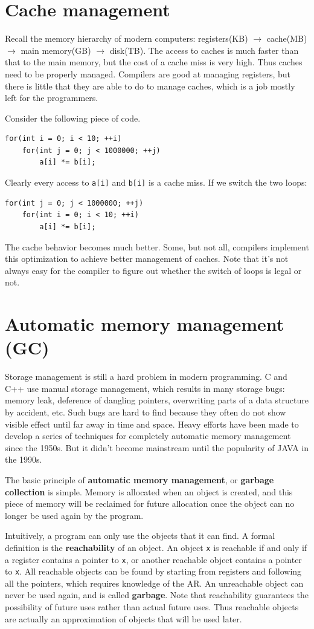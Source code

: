 \section{Cache management}
Recall the memory hierarchy of modern computers: registers(KB) $\rightarrow$ cache(MB) $\rightarrow$ main memory(GB) $\rightarrow$ disk(TB). The access to caches is much faster than that to the main memory, but the cost of a cache miss is very high. Thus caches need to be properly managed. Compilers are good at managing registers, but there is little that they are able to do to manage caches, which is a job mostly left for the programmers.

Consider the following piece of code.
\begin{lstlisting}
for(int i = 0; i < 10; ++i)
	for(int j = 0; j < 1000000; ++j)
		a[i] *= b[i];
\end{lstlisting}
Clearly every access to \texttt{a[i]} and \texttt{b[i]} is a cache miss. If we switch the two loops:
\begin{lstlisting}
for(int j = 0; j < 1000000; ++j)
	for(int i = 0; i < 10; ++i)
		a[i] *= b[i];
\end{lstlisting}
The cache behavior becomes much better. Some, but not all, compilers implement this optimization to achieve better management of caches. Note that it's not always easy for the compiler to figure out whether the switch of loops is legal or not.
\section{Automatic memory management (GC)}

Storage management is still a hard problem in modern programming. C and C++ use manual storage management, which results in many storage bugs: memory leak, deference of dangling pointers, overwriting parts of a data structure by accident, etc. Such bugs are hard to find because they often do not show visible effect until far away in time and space. Heavy efforts have been made to develop a series of techniques for completely automatic memory management since the 1950s. But it didn't become mainstream until the popularity of JAVA in the 1990s. 

The basic principle of \textbf{automatic memory management}, or \textbf{garbage collection} is simple. Memory is allocated when an object is created, and this piece of memory will be reclaimed for future allocation once the object can no longer be used again by the program. 

Intuitively, a program can only use the objects that it can find. A formal definition is the \textbf{reachability} of an object. An object \texttt{x} is reachable if and only if a register contains a pointer to \texttt{x}, or another reachable object contains a pointer to \texttt{x}. All reachable objects can be found by starting from registers and following all the pointers, which requires knowledge of the AR. An unreachable object can never be used again, and is called \textbf{garbage}. Note that reachability guarantees the possibility of future uses rather than actual future uses. Thus reachable objects are actually an approximation of objects that will be used later.  


